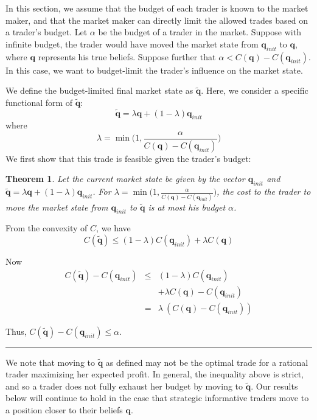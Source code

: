 \documentclass{article}
\newcommand{\qvec}{\mathbf{q}}
\newtheorem{theorem}{Theorem}
\newcommand{\qed}{\hfill\rule{7pt}{7pt}}
\newenvironment{proof}{\noindent{\bf Proof:}}{\qed\medskip}
\begin{document}

In this section, we assume that the budget of each trader is known to the market maker, and that the market maker can directly limit the allowed trades based on a trader's budget. 
Let $\alpha$ be the budget of a trader in the market. Suppose with infinite budget, the trader would have moved the market state from $\qvec_{init}$ to $\qvec$, where $\qvec$ represents his true beliefs. Suppose further that $\alpha<C(\qvec)-C(\qvec_{init})$. In this case, we want to budget-limit the trader's influence on the market state. 

We define the budget-limited final market state as $\tilde{\qvec}$. 
Here, we consider a specific functional form of $\tilde{\qvec}$: $$\tilde{\qvec}=\lambda\qvec+(1-\lambda)\qvec_{init}$$  where $$\lambda=\min\Big(1, \frac{\alpha}{C(\qvec) - C(\qvec_{init})}\Big)$$ We first show that this trade is feasible given the trader's budget:
\begin{theorem}
Let the current market state be given by the vector $\qvec_{init}$ and $\tilde{\qvec}=\lambda\qvec+(1-\lambda)\qvec_{init}$. For $\lambda=\min\Big(1, \frac{\alpha}{C(\qvec) - C(\qvec_{init})}\Big)$, the cost to the trader to move the market state from $\qvec_{init}$ to $\tilde{\qvec}$ is at most his budget $\alpha$.
\end{theorem}
\begin{proof}
From the convexity of $C$, we have
 $$C(\tilde{\qvec})\leq(1-\lambda)C(\qvec_{init})+\lambda C(\qvec)$$

Now 
\begin{eqnarray*}
C(\tilde{\qvec}) - C(\qvec_{init}) &\leq& (1-\lambda)C(\qvec_{init})\\&&+\lambda C(\qvec) - C(\qvec_{init})\\
&=& \lambda\ (C(\qvec) - C(\qvec_{init}))
\end{eqnarray*}

%
 Thus, $C(\tilde{\qvec}) - C(\qvec_{init}) \leq \alpha$. 
 \end{proof}
 
 We note that moving to $\tilde{\qvec}$ as defined may not be the optimal trade for a rational trader maximizing her expected profit. In general, the inequality above is strict, and so a trader does not fully exhaust her budget by moving to $\tilde{\qvec}$. Our results below will continue to hold in the case that strategic informative traders move to a position closer to their beliefs $\qvec$.
\end{document}
